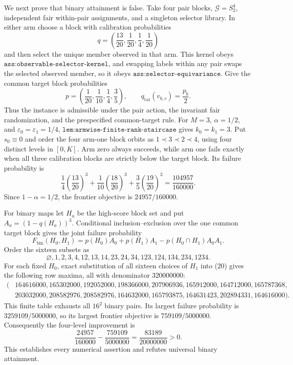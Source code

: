 We next prove that binary attainment is false. Take four pair blocks, \(\mathcal G=S_2^4\), independent fair within-pair assignments, and a singleton selector library. In either arm choose a block with calibration probabilities
\[
q=\left(\frac{13}{20},\frac1{20},\frac14,\frac1{20}\right)
\]
and then select the unique member observed in that arm. This kernel obeys \(\texttt{ass:observable-selector-kernel}\), and swapping labels within any pair swaps the selected observed member, so it obeys \(\texttt{ass:selector-equivariance}\). Give the common target block probabilities
\[
p=\left(\frac1{20},\frac1{10},\frac14,\frac35\right),\qquad
q_{\mathrm{tar}}(v_{b,r})=\frac{p_b}{2}. \tag{18}
\]
Thus the instance is admissible under the pair action, the invariant fair randomization, and the prespecified common-target rule. For \(M=3\), \(\alpha=1/2\), and \(\varepsilon_0=\varepsilon_1=1/4\), \(\texttt{lem:armwise-finite-rank-staircase}\) gives \(k_0=k_1=3\). Put \(s_0\equiv0\) and order the four arm-one block orbits as \(1\prec3\prec2\prec4\), using four distinct levels in \([0,K]\). Arm zero always succeeds, while arm one fails exactly when all three calibration blocks are strictly below the target block. Its failure probability is
\[
\frac14\left(\frac{13}{20}\right)^3+
\frac1{10}\left(\frac{18}{20}\right)^3+
\frac35\left(\frac{19}{20}\right)^3
=\frac{104957}{160000}. \tag{19}
\]
Since \(1-\alpha=1/2\), the frontier objective is \(24957/160000\).

For binary maps let \(H_a\) be the high-score block set and put \(A_a=(1-q(H_a))^3\). Conditional inclusion--exclusion over the one common target block gives the joint failure probability
\[
F_{\mathrm{bin}}(H_0,H_1)
=p(H_0)A_0+p(H_1)A_1-p(H_0\cap H_1)A_0A_1. \tag{20}
\]
Order the sixteen subsets as
\[
\varnothing,1,2,3,4,12,13,14,23,24,34,123,124,134,234,1234.
\]
For each fixed \(H_0\), exact substitution of all sixteen choices of \(H_1\) into (20) gives the following row maxima, all with denominator \(320000000\):
\[
\begin{split}
(&164616000,165302000,192052000,198366000,207906936,165912000,164712000,165787368,\\
&203032000,208582976,208582976,164632000,165793875,164631423,202894331,164616000).
\end{split} \tag{21}
\]
This finite table exhausts all \(16^2\) binary pairs. Its largest failure probability is \(3259109/5000000\), so its largest frontier objective is \(759109/5000000\). Consequently the four-level improvement is
\[
\frac{24957}{160000}-\frac{759109}{5000000}
=\frac{83189}{20000000}>0. \tag{22}
\]
This establishes every numerical assertion and refutes universal binary attainment.

